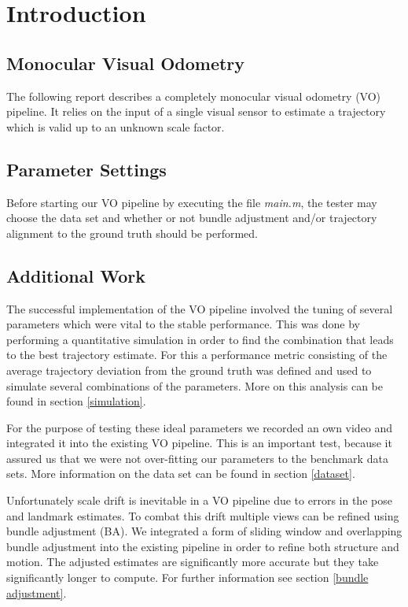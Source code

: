 \chapter{Introduction}
\section{Monocular Visual Odometry}
The following report describes a completely monocular visual odometry (VO) pipeline. It relies on the input of a single visual sensor to estimate a trajectory which is valid up to an unknown scale factor.

\section{Parameter Settings}
\label{params}
Before starting our VO pipeline by executing the file \emph{main.m}, the tester may choose the data set and whether or not bundle adjustment and/or trajectory alignment to the ground truth should be performed.

\section{Additional Work}
The successful implementation of the VO pipeline involved the tuning of several parameters which were vital to the stable performance. This was done by performing a quantitative simulation in order to find the combination that leads to the best trajectory estimate. For this a performance metric consisting of the average trajectory deviation from the ground truth was defined and used to simulate several combinations of the parameters. More on this analysis can be found in section \ref{simulation}. \par
For the purpose of testing these ideal parameters we recorded an own video and integrated it into the existing VO pipeline. This is an important test, because it assured us that we were not over-fitting our parameters to the benchmark data sets. More information on the data set can be found in section \ref{dataset}. \par
Unfortunately scale drift is inevitable in a VO pipeline due to errors in the pose and landmark estimates. To combat this drift multiple views can be refined using bundle adjustment (BA). We integrated a form of sliding window and overlapping bundle adjustment into the existing pipeline in order to refine both structure and motion. The adjusted estimates are significantly more accurate but they take significantly longer to compute. For further information see section \ref{bundle adjustment}.
